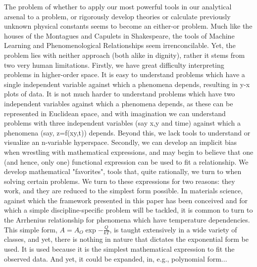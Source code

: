 The problem of whether to apply our most powerful tools in our analytical arsenal to a problem, or rigorously develop theories or calculate previously unknown physical constants seems to become an either-or problem.  Much like the houses of the Montagues and Capulets in Shakespeare, the tools of Machine Learning and Phenomenological Relationships seem irrenconcilable. Yet, the problem lies with neither approach (both alike in dignity), rather it stems from two very human limitations. Firstly, we have great difficulty interpreting problems in higher-order space.  It is easy to understand problems which have a single independent variable against which a phenomena depends, resulting in y-x plots of data.  It is not much harder to understand problems which have two independent variables against which a phenomena depends, as these can be represented in Euclidean space, and with imagination we can understand problems with three independent variables (say x,y and time) against which a phenomena (say, z=f(xy,t)) depends.  Beyond this, we lack tools to understand or visualize an n-variable hyperspace.  Secondly, we can develop an implicit bias when wrestling with mathematical expressions, and may begin to believe that one (and hence, only one) functional expression can be used to fit a relationship.  We develop mathematical "favorites", tools that, quite rationally, we turn to when solving certain problems.  We turn to these expressions for two reasons: they work, and they are reduced to the simplest form possible.  In materials science, against which the framework presented in this paper has been conceived and for which a simple discipline-specific problem will be tackled, it is common to turn to the Arrhenius relationship for phenomena which have temperature dependencies.  This simple form, $A=A_O\exp{-\frac{Q}{kT}}$, is taught extensively in a wide variety of classes, and yet, there is nothing in nature that dictates the exponential form be used.  It is used because it is the simplest mathematical expression to fit the observed data.  And yet, it could be expanded, in, e.g., polynomial form... \\

